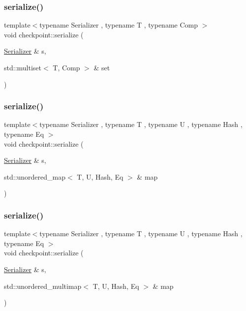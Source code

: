 \subsubsection{\texorpdfstring{serialize()}{serialize()}\hspace{0.1cm}{\footnotesize\ttfamily [21/25]}}
{\footnotesize\ttfamily template$<$typename Serializer , typename T , typename Comp $>$ \\
void checkpoint\+::serialize (\begin{DoxyParamCaption}\item[{\hyperlink{structcheckpoint_1_1_serializer}{Serializer} \&}]{s,  }\item[{std\+::multiset$<$ T, Comp $>$ \&}]{set }\end{DoxyParamCaption})\hspace{0.3cm}{\ttfamily [inline]}}

\mbox{\label{namespacecheckpoint_a9fc2f3eb20d3ce8d6145e99a2559ea58}} 
\subsubsection{\texorpdfstring{serialize()}{serialize()}\hspace{0.1cm}{\footnotesize\ttfamily [22/25]}}
{\footnotesize\ttfamily template$<$typename Serializer , typename T , typename U , typename Hash , typename Eq $>$ \\
void checkpoint\+::serialize (\begin{DoxyParamCaption}\item[{\hyperlink{structcheckpoint_1_1_serializer}{Serializer} \&}]{s,  }\item[{std\+::unordered\+\_\+map$<$ T, U, Hash, Eq $>$ \&}]{map }\end{DoxyParamCaption})\hspace{0.3cm}{\ttfamily [inline]}}

\mbox{\label{namespacecheckpoint_aa77eeb7a036d253ef33ed2c9ef764a5e}} 
\subsubsection{\texorpdfstring{serialize()}{serialize()}\hspace{0.1cm}{\footnotesize\ttfamily [23/25]}}
{\footnotesize\ttfamily template$<$typename Serializer , typename T , typename U , typename Hash , typename Eq $>$ \\
void checkpoint\+::serialize (\begin{DoxyParamCaption}\item[{\hyperlink{structcheckpoint_1_1_serializer}{Serializer} \&}]{s,  }\item[{std\+::unordered\+\_\+multimap$<$ T, U, Hash, Eq $>$ \&}]{map }\end{DoxyParamCaption})\hspace{0.3cm}{\ttfamily [inline]}}

